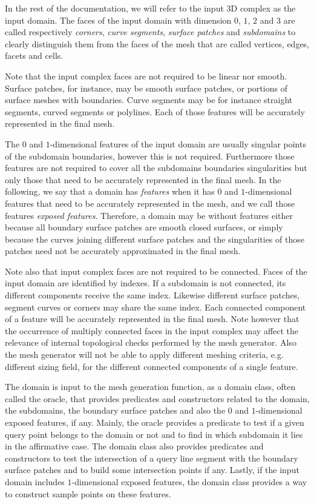 In the rest of the documentation, we will refer to the
input 3D complex as  the input domain. The faces of the input domain 
with dimension $0$, $1$, $2$ and $3$ are called respectively
{\em corners},  {\em curve segments}, {\em surface patches} and {\em subdomains}
to clearly distinguish them from the faces of the mesh
that are called vertices, edges, facets and cells.

Note that the input complex faces are not required to be linear nor smooth.
Surface patches, for instance, may be smooth surface patches, 
or portions of surface meshes with boundaries.
Curve segments may be  for instance straight segments, curved segments
or polylines. Each of those features will be accurately represented in the final mesh.



The $0$ and $1$-dimensional features of the input domain are usually singular  points
of the subdomain boundaries, however this is not required. Furthermore those features
are not required to cover all the subdomains  boundaries singularities
 but only those that need to be accurately represented in the final mesh.
In the following, we say that a domain has {\em features} when it has $0$ and
$1$-dimensional features that need to be accurately represented in the mesh,
and we call those features {\em exposed features}.
Therefore, a domain may be without features either because all boundary surface patches
are smooth closed surfaces, or simply because the curves  joining  different surface patches
and the singularities of those  patches need not be accurately approximated
in the final mesh.

Note also that input complex faces are not  required to be connected.
Faces of the input domain are identified by  indexes.
If a subdomain is not connected, its different components receive the same index.
Likewise different surface patches, segment curves or corners may share the same index.
Each connected component of a feature  will be accurately represented
in the final mesh.
Note however that the occurrence of multiply connected faces in the
input complex may affect the relevance of internal topological checks
performed by the mesh generator.  Also the mesh generator
will not be able to apply  different meshing criteria, e.g. different
sizing field, for the different connected components of a single feature. 

The domain is input to the mesh generation function,
as a domain class, often called  the  oracle,
that provides predicates and constructors related to the domain,
the subdomains, the boundary surface patches
and  also the $0$ and $1$-dimensional exposed features, if any.
Mainly, the oracle provides  a predicate to test
if  a given query point belongs 
to the domain or not
and  to find in which subdomain it lies in the affirmative case.
The domain class also provides predicates  and constructors to test the intersection of a query line segment
with the boundary  surface patches and to build some intersection points if any.
Lastly, if the input domain includes $1$-dimensional exposed features, the domain class
provides a way to construct sample points on these features.

